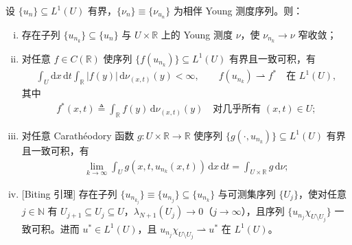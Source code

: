 \documentclass[../main.tex]{subfiles}
\begin{document}
\begin{theorem}\label{theorem:intro-0.2.2}
设 $\{u_n\}\subseteq L^1(U)$ 有界，$\{\nu_n\}\equiv\{\nu_{u_n}\}$ 为相伴 Young 测度序列。则：
\begin{enumerate}[(i)]
\item\label{item:intro-0.2.2-i} 存在子列 $\{u_{n_k}\}\subseteq\{u_n\}$ 与 $U\times\mathbb{R}$ 上的 Young 测度 $\nu$，使 $\nu_{n_k}\to\nu$ 窄收敛；
\item\label{item:intro-0.2.2-ii} 对任意 $f\in C(\mathbb{R})$ 使序列 $\{f(u_{n_k})\}\subseteq L^1(U)$ 有界且一致可积，有
\begin{align*}
\int_U\mathrm{d}x\,\mathrm{d}t\int_{\mathbb{R}}|f(y)|\,\mathrm{d}\nu_{(x,t)}(y)<\infty,
\qquad
f(u_{n_k})\rightharpoonup f^* \quad \text{在 }L^1(U),
\end{align*}
其中
\begin{align}
f^*(x,t) \triangleq  \int_{\mathbb{R}}f(y)\,\mathrm{d}\nu_{(x,t)}(y)
\quad \text{对几乎所有 }(x,t)\in U; \label{align:intro-0.13}
\end{align}
\item\label{item:intro-0.2.2-iii} 对任意 Carathéodory 函数 $g:U\times\mathbb{R}\to\mathbb{R}$ 使序列 $\{g(\cdot,u_{n_k})\}\subseteq L^1(U)$ 有界且一致可积，有
\begin{align*}
\lim_{k\to\infty}\int_U g(x,t,u_{n_k}(x,t))\,\mathrm{d}x\,\mathrm{d}t
= \int_{U\times\mathbb{R}}g\,\mathrm{d}\nu;
\end{align*}
\item\label{item:intro-0.2.2-iv} [Biting 引理] 存在子列 $\{u_{n_{k_j}}\}\equiv\{u_{n_j}\}\subseteq\{u_{n_k}\}$ 与可测集序列 $\{U_j\}$，使对任意 $j\in\mathbb{N}$ 有 $U_{j+1}\subseteq U_j\subseteq U$，$\lambda_{N+1}(U_j)\to0$（$j\to\infty$），且序列 $\{u_{n_j}\chi_{U\setminus U_j}\}$ 一致可积。进而 $u^*\in L^1(U)$，且 $u_{n_j}\chi_{U\setminus U_j}\rightharpoonup u^*$ 在 $L^1(U)$。
\end{enumerate}
\end{theorem}
\end{document}

